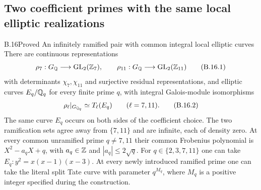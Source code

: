 \subsection{Two coefficient primes with the same local elliptic realizations}

\begin{statement}{B.16}{Proved}
{An infinitely ramified pair with common integral local elliptic curves}
There are continuous representations
\[
 \rho_7:G_\mathbb Q\longrightarrow\mathrm{GL}_2(\mathbb Z_7),\qquad
 \rho_{11}:G_\mathbb Q\longrightarrow\mathrm{GL}_2(\mathbb Z_{11})
 \tag{B.16.1}
\]
with determinants $\chi_7,\chi_{11}$ and surjective residual
representations, and elliptic curves $E_q/\mathbb Q_q$ for every finite
prime $q$, with integral Galois-module isomorphisms
\[
 \rho_\ell|_{G_{\mathbb Q_q}}\simeq T_\ell(E_q)
       \qquad(\ell=7,11).
 \tag{B.16.2}
\]
The same curve $E_q$ occurs on both sides of the coefficient choice.
The two ramification sets agree away from $\{7,11\}$ and are
infinite, each of density zero.
At every common unramified prime $q\ne7,11$ their common Frobenius
polynomial is $X^2-a_qX+q$, with $a_q\in\mathbb Z$ and
$|a_q|\le2\sqrt q$.
For $q\in\{2,3,7,11\}$ one can take
$E_q:y^2=x(x-1)(x-3)$.  At every newly introduced ramified prime
one can take the literal split Tate curve with parameter $q^{M_q}$,
where $M_q$ is a positive integer specified during the construction.
\end{statement}
